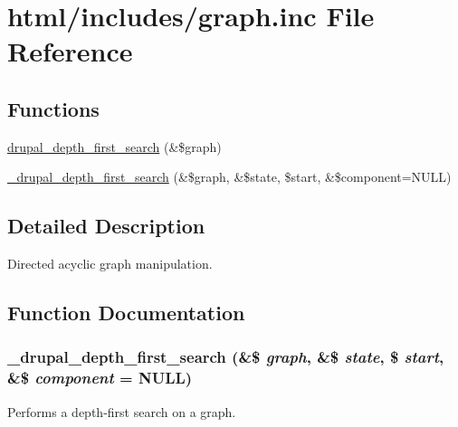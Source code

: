 \hypertarget{graph_8inc}{
\section{html/includes/graph.inc File Reference}
\label{graph_8inc}
}
\subsection*{Functions}
\begin{DoxyCompactItemize}
\item 
\hyperlink{graph_8inc_ab1e9257090d35212bd3dd3eba7706471}{drupal\_\-depth\_\-first\_\-search} (\&\$graph)
\item 
\hyperlink{graph_8inc_ac59acd453622f095c7861c3404b5c176}{\_\-drupal\_\-depth\_\-first\_\-search} (\&\$graph, \&\$state, \$start, \&\$component=NULL)
\end{DoxyCompactItemize}


\subsection{Detailed Description}
Directed acyclic graph manipulation. 

\subsection{Function Documentation}
\hypertarget{graph_8inc_ac59acd453622f095c7861c3404b5c176}{
\subsubsection[{\_\-drupal\_\-depth\_\-first\_\-search}]{\setlength{\rightskip}{0pt plus 5cm}\_\-drupal\_\-depth\_\-first\_\-search (\&\$ {\em graph}, \/  \&\$ {\em state}, \/  \$ {\em start}, \/  \&\$ {\em component} = {\ttfamily NULL})}}
\label{graph_8inc_ac59acd453622f095c7861c3404b5c176}
Performs a depth-\/first search on a graph.


